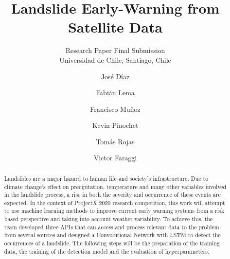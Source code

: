 \documentclass[sigconf, nonacm]{acmart}
\begin{document}
\title{Landslide Early-Warning from Satellite Data}
\subtitle{Research Paper Final Submission \\
Universidad de Chile, Santiago, Chile} 


\author{José Díaz}
\affiliation{}

\author{Fabián Lema}
\affiliation{}

\author{Francisco Muñoz}
\affiliation{}

\author{Kevin Pinochet}
\affiliation{}

\author{Tomás Rojas}
\affiliation{}

\author{Victor Faraggi}
\affiliation{}

\begin{abstract}

% 
Landslides are a major hazard to human life and society's infrastructure. Due to climate change's effect on precipitation, temperature and many other variables involved in the landslide process, a rise in both the severity and occurrence of these events are expected. In the context of ProjectX 2020 research competition, this work will attempt to use machine learning methods to improve current early warning systems from a risk based perspective and taking into account weather variability. %
To achieve this, the team developed three APIs that can access and process relevant data to the problem from several sources and designed a Convolutional Network with LSTM to detect the occurrences of a landslide. The following steps will be the preparation of the training data, the training of the detection model and the evaluation of hyperparameters.

\end{abstract}
\end{document}

